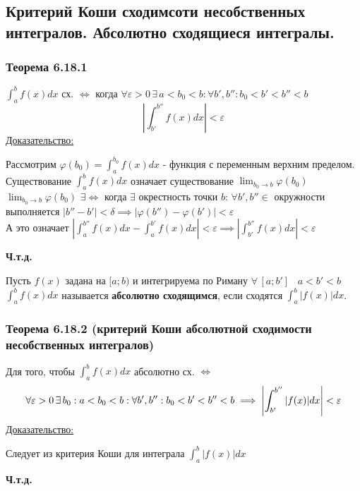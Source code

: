\documentclass[12pt]{article}
\begin{document}
    \subsection{Критерий Коши сходимсоти несобственных интегралов. Абсолютно сходящиеся интегралы.}
    \subsubsection*{Теорема 6.18.1}\label{th:6.18.1}
    $\int_{a}^{b}f(x)dx$ сх. $\Longleftrightarrow$ когда $\forall \varepsilon > 0\,\exists\,a<b_0<b:\forall b',b'':b_0<b'<b''<b$
    \[ \left| \int_{b'}^{b''}f(x)dx \right| < \varepsilon \]
    \underline{Доказательство:}
    \begin{adjustwidth}{1.5em}{1.5em}
        Рассмотрим $\varphi(b_0)=\int_{a}^{b_0}f(x)dx$ - функция с переменным верхним пределом.\\
        Существование $\int_{a}^{b}f(x)dx$ означает существование $\lim_{b_0 \to b}\varphi(b_0)$\\
        $\lim_{b_0 \to b}\varphi(b_0)$ $\exists \Longleftrightarrow$ когда $\exists$ окрестность точки $b$: $\forall b',b'' \in $ окружности выполняется $|b''-b'|<\delta \implies |\varphi(b'')-\varphi(b')|<\varepsilon$\\
        А это означает $\left| \int_{a}^{b''}f(x)dx - \int_{a}^{b'}f(x)dx \right| < \varepsilon \implies \left| \int_{b'}^{b''} f(x)dx \right| < \varepsilon$
        \begin{center}
            \textbf{Ч.т.д.}
        \end{center}
    \end{adjustwidth}
    Пусть $f(x)$ задана на $[a;b)$ и интегрируема по Риману $\forall\,[a;b'] \;\;\; a<b'<b$\\
    $\int_{a}^{b}f(x)dx$ называется \textbf{абсолютно сходящимся}, если сходятся $\int_{a}^{b}|f(x)|dx$.
    \subsubsection*{Теорема 6.18.2 (критерий Коши абсолютной сходимости несобственных интегралов)}\label{th:6.18.2}
    Для того, чтобы $\int_{a}^{b}f(x)dx$ абсолютно сх. $\Longleftrightarrow$ 
    \[ \forall \varepsilon >0\,\exists\,b_0:a<b_0<b: \forall b',b'':\\b_0<b'<b''<b \implies \left|\int_{b'}^{b''}|f(x)|dx\right| < \varepsilon \]
    \underline{Доказательство:}
    \begin{adjustwidth}{1.5em}{1.5em}
        Следует из критерия Коши для интеграла $\int_{a}^{b}|f(x)|dx$
        \begin{center}
            \textbf{Ч.т.д.}
        \end{center}
    \end{adjustwidth}
\end{document}
